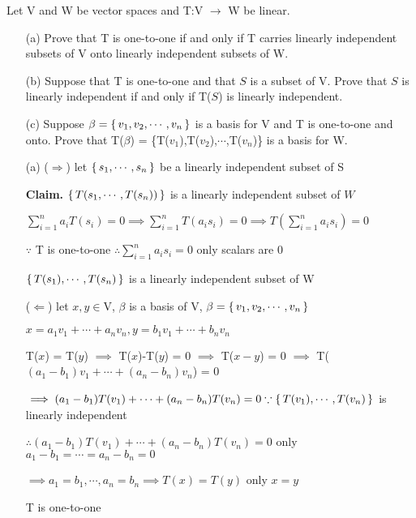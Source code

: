 Let V and W be vector spaces and T:V $\rightarrow$ W be linear.

\begin{enumerate}
	\item[(a)] Prove that T is one-to-one if and only if T carries linearly independent subsets of V onto linearly independent subsets of W.
	\item[(b)] Suppose that T is one-to-one and that $S$ is a subset of V. Prove that $S$ is linearly independent if and only if T($S$) is linearly independent.
	\item[(c)] Suppose $\beta = \left\{ \,v_1,v_2,\cdots,v_n \,\right\}$ is a basis for V and T is one-to-one and onto. Prove that T($\beta$) = \{T($v_1$),T($v_2$),$\cdots$,T($v_n$)\} is a basis for W.
\end{enumerate}

\begin{tcolorbox}
\begin{solution}
	\begin{enumerate}
		\item[(a)]
		($\Rightarrow$) let $\left\{ \,s_1,\cdots,s_n \,\right\}$ be a linearly independent subset of S
		
		\textbf{Claim.} $\left\{ \,T(s_1,\cdots,T(s_n)) \,\right\}$ is a linearly independent subset of $W$
		
		$\sum^{n}_{i=1}a_iT(s_i) = 0 \implies \sum^{n}_{i=1}T(a_is_i) = 0 \implies T(\sum^{n}_{i=1}a_is_i)=0$
		
		$\because $ T is one-to-one $\therefore \sum^{n}_{i=1}a_is_i = 0$ only scalars are $0$
		
		$\left\{ \,T(s_1),\cdots,T(s_n) \,\right\}$ is a linearly independent subset of W
		
		($\Leftarrow$) let $x,y \in $V, $\beta$ is a basis of V, $\beta = \left\{ \,v_1,v_2,\cdots,v_n \,\right\}$
		
		$x = a_1v_1+\cdots+a_nv_n, y= b_1v_1 + \cdots + b_nv_n$
		
		T($x$) = T($y$) $\implies$ T($x$)-T($y$) = 0 $\implies$ T($x-y$) = 0 $\implies$ T($(a_1-b_1)v_1+\cdots+(a_n-b_n)v_n$) = $0$
		
		$\implies (a_1-b_1)T(v_1) + \cdots + (a_n-b_n)T(v_n) = 0 \because \left\{ \,T(v_1),\cdots,T(v_n) \,\right\}$ is linearly independent
		
		$\therefore (a_1 - b_1)T(v_1) + \cdots + (a_n-b_n)T(v_n) = 0$ only $a_1-b_1=\cdots=a_n-b_n=0$
		
		$\implies a_1 = b_1,\cdots,a_n=b_n \implies T(x) = T(y)$ only $x=y$
		
		T is one-to-one
	\end{enumerate}

\end{solution}

\end{tcolorbox}

